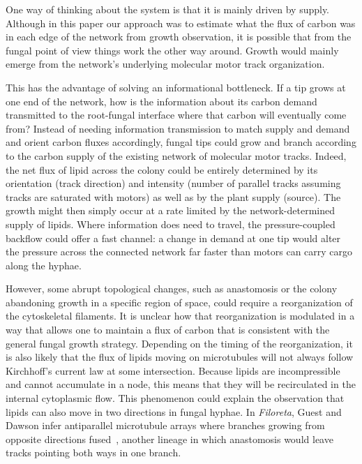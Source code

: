 One way of thinking about the system is that it is mainly driven by supply.
Although in this paper our approach was to estimate what the flux of carbon was in each edge of the network from growth observation, it is possible that from the fungal point of view things work the other way around.
Growth would mainly emerge from the network's underlying molecular motor track organization.

This has the advantage of solving an informational bottleneck.
If a tip grows at one end of the network, how is the information about its carbon demand transmitted to the root-fungal interface where that carbon will eventually come from?
Instead of needing information transmission to match supply and demand and orient carbon fluxes accordingly, fungal tips could grow and branch according to the carbon supply of the existing network of molecular motor tracks.
Indeed, the net flux of lipid across the colony could be entirely determined by its orientation (track direction) and intensity (number of parallel tracks assuming tracks are saturated with motors) as well as by the plant supply (source).
The growth might then simply occur at a rate limited by the network-determined supply of lipids.
Where information does need to travel, the pressure-coupled backflow could offer a fast channel: a change in demand at one tip would alter the pressure across the connected network far faster than motors can carry cargo along the hyphae.

However, some abrupt topological changes, such as anastomosis or the colony abandoning growth in a specific region of space, could require a reorganization of the cytoskeletal filaments.
It is unclear how that reorganization is modulated in a way that allows one to maintain a flux of carbon that is consistent with the general fungal growth strategy.
Depending on the timing of the reorganization, it is also likely that the flux of lipids moving on microtubules will not always follow Kirchhoff's current law at some intersection.
Because lipids are incompressible and cannot accumulate in a node, this means that they will be recirculated in the internal cytoplasmic flow.
This phenomenon could explain the observation that lipids can also move in two directions in fungal hyphae.
In \textit{Filoreta}, Guest and Dawson infer antiparallel microtubule arrays where branches growing from opposite directions fused~\cite{guest_multiple_2026}, another lineage in which anastomosis would leave tracks pointing both ways in one branch.


